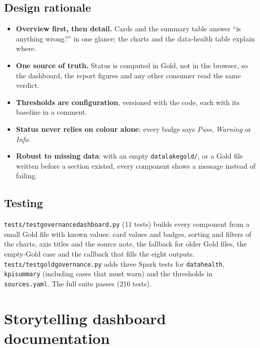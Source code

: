 \documentclass[11pt,a4paper]{article}
\renewcommand{\_}{\textunderscore\allowbreak}
\begin{document}
\subsection{Design rationale}
\begin{itemize}
  \item \textbf{Overview first, then detail.} Cards and the summary table answer ``is anything wrong?''
        in one glance; the charts and the data-health table explain where.
  \item \textbf{One source of truth.} Status is computed in Gold, not in the browser, so the dashboard, the
        report figures and any other consumer read the same verdict.
  \item \textbf{Thresholds are configuration}, versioned with the code, each with its baseline in a comment.
  \item \textbf{Status never relies on colour alone}: every badge says \emph{Pass}, \emph{Warning} or
        \emph{Info}.
  \item \textbf{Robust to missing data}: with an empty \texttt{datalake\_gold/}, or a Gold file written
        before a section existed, every component shows a message instead of failing.
\end{itemize}

\subsection{Testing}
\texttt{tests/test\_governance\_dashboard.py} (11 tests) builds every component from a small Gold file with
known values: card values and badges, sorting and filters of the charts, axis titles and the source note,
the fallback for older Gold files, the empty-Gold case and the callback that fills the eight outputs.
\texttt{tests/test\_gold\_governance.py} adds three Spark tests for \texttt{data\_health},
\texttt{kpi\_summary} (including cases that must warn) and the thresholds in \texttt{sources.yaml}.
The full suite passes (216 tests).

\section{Storytelling dashboard documentation}\label{sec:storytelling}
\end{document}
